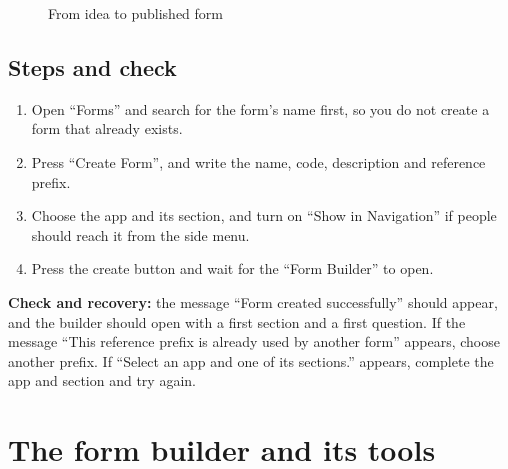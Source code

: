 \begin{figure}[H]
\centering
{}
\rclegend
\caption{From idea to published form}
\label{fig:builder-forms-flow}
\end{figure}

\subsection{Steps and check}
\begin{enumerate}
\item Open “Forms” and search for the form's name first, so you do not create a form that already exists.
\item Press “Create Form”, and write the name, code, description and reference prefix.
\item Choose the app and its section, and turn on “Show in Navigation” if people should reach it from the side menu.
\item Press the create button and wait for the “Form Builder” to open.
\end{enumerate}

\textbf{Check and recovery:} the message “Form created successfully” should appear, and the builder should open with a first section and a first question. If the message “This reference prefix is already used by another form” appears, choose another prefix. If “Select an app and one of its sections.” appears, complete the app and section and try again.

\clearpage
\section{The form builder and its tools}
\label{sec:builder-feature-forms-builder}

